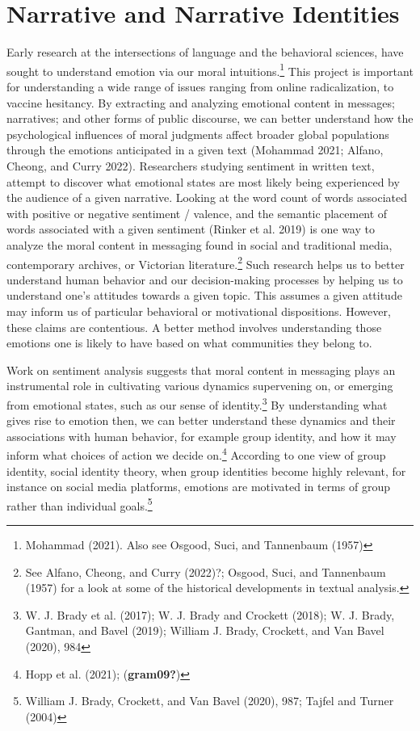 \documentclass[12pt]{book}
\theoremstyle{definition}
\theoremstyle{remark}
\begin{document}
\section{Narrative and Narrative Identities}\label{narrative-and-narrative-identities-2}

Early research at the intersections of language and the behavioral sciences, have sought to understand emotion via our moral intuitions.\footnote{Mohammad (2021). Also see Osgood, Suci, and Tannenbaum (1957)} This project is important for understanding a wide range of issues ranging from online radicalization, to vaccine hesitancy. By extracting and analyzing emotional content in messages; narratives; and other forms of public discourse, we can better understand how the psychological influences of moral judgments affect broader global populations through the emotions anticipated in a given text (Mohammad 2021; Alfano, Cheong, and Curry 2022). Researchers studying sentiment in written text, attempt to discover what emotional states are most likely being experienced by the audience of a given narrative. Looking at the word count of words associated with positive or negative sentiment / valence, and the semantic placement of words associated with a given sentiment (Rinker et al. 2019) is one way to analyze the moral content in messaging found in social and traditional media, contemporary archives, or Victorian literature.\footnote{See Alfano, Cheong, and Curry (2022)?; Osgood, Suci, and Tannenbaum (1957) for a look at some of the historical developments in textual analysis.} Such research helps us to better understand human behavior and our decision-making processes by helping us to understand one's attitudes towards a given topic. This assumes a given attitude may inform us of particular behavioral or motivational dispositions. However, these claims are contentious. A better method involves understanding those emotions one is likely to have based on what communities they belong to.

Work on sentiment analysis suggests that moral content in messaging plays an instrumental role in cultivating various dynamics supervening on, or emerging from emotional states, such as our sense of identity.\footnote{W. J. Brady et al. (2017); W. J. Brady and Crockett (2018); W. J. Brady, Gantman, and Bavel (2019); William J. Brady, Crockett, and Van Bavel (2020), 984} By understanding what gives rise to emotion then, we can better understand these dynamics and their associations with human behavior, for example group identity, and how it may inform what choices of action we decide on.\footnote{Hopp et al. (2021); (\textbf{gram09?})} According to one view of group identity, social identity theory, when group identities become highly relevant, for instance on social media platforms, emotions are motivated in terms of group rather than individual goals.\footnote{William J. Brady, Crockett, and Van Bavel (2020), 987; Tajfel and Turner (2004)}
\end{document}

